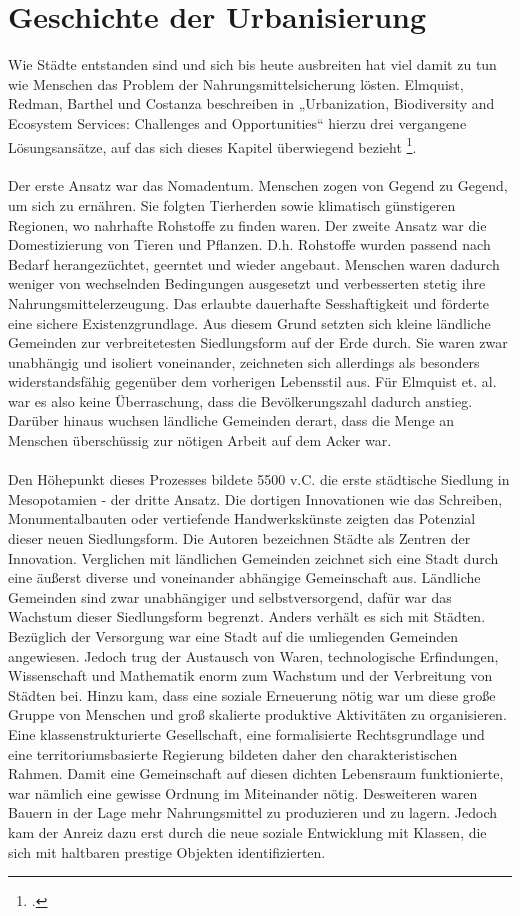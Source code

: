 \documentclass{article}
\begin{document}
\section{Geschichte der Urbanisierung}

Wie Städte entstanden sind und sich bis heute ausbreiten hat viel damit zu tun wie Menschen das Problem der Nahrungsmittelsicherung lösten. Elmquist, Redman, Barthel und Costanza beschreiben in „Urbanization, Biodiversity and Ecosystem Services: Challenges and Opportunities“ hierzu drei vergangene Lösungsansätze, auf das sich dieses Kapitel überwiegend bezieht  \footcite[S.14ff]{Elmqvist2013}. 
\\
\\ 
Der erste Ansatz war das Nomadentum. Menschen zogen von Gegend zu Gegend, um sich zu ernähren. Sie folgten Tierherden sowie klimatisch günstigeren Regionen, wo nahrhafte Rohstoffe zu finden waren. Der zweite Ansatz war die Domestizierung von Tieren und Pflanzen. D.h. Rohstoffe wurden passend nach Bedarf herangezüchtet, geerntet und wieder angebaut. Menschen waren dadurch weniger von wechselnden Bedingungen ausgesetzt und verbesserten stetig ihre Nahrungsmittelerzeugung. Das erlaubte dauerhafte Sesshaftigkeit und förderte eine sichere Existenzgrundlage. Aus diesem Grund setzten sich kleine ländliche Gemeinden zur verbreitetesten Siedlungsform auf der Erde durch. Sie waren zwar unabhängig und isoliert voneinander, zeichneten sich allerdings als besonders widerstandsfähig gegenüber dem vorherigen Lebensstil aus. Für Elmquist et. al. war es also keine Überraschung, dass die Bevölkerungszahl dadurch anstieg. Darüber hinaus wuchsen ländliche Gemeinden derart, dass die Menge an Menschen überschüssig zur nötigen Arbeit auf dem Acker war. \\
\\
Den Höhepunkt dieses Prozesses bildete 5500 v.C. die erste städtische Siedlung in Mesopotamien - der dritte Ansatz. Die dortigen Innovationen wie das Schreiben, Monumentalbauten oder vertiefende Handwerkskünste zeigten das Potenzial dieser neuen Siedlungsform. Die Autoren bezeichnen Städte als Zentren der Innovation. Verglichen mit ländlichen Gemeinden zeichnet sich eine Stadt durch eine äußerst diverse und voneinander abhängige Gemeinschaft aus. Ländliche Gemeinden sind zwar unabhängiger und selbstversorgend, dafür war das Wachstum dieser Siedlungsform begrenzt. Anders verhält es sich mit Städten. Bezüglich der Versorgung war eine Stadt auf die umliegenden Gemeinden angewiesen. Jedoch trug der Austausch von Waren, technologische Erfindungen, Wissenschaft und Mathematik enorm zum Wachstum und der Verbreitung von Städten bei. Hinzu kam, dass eine soziale Erneuerung nötig war um diese große Gruppe von Menschen und groß skalierte produktive Aktivitäten zu organisieren. Eine klassenstrukturierte Gesellschaft, eine formalisierte Rechtsgrundlage und eine territoriumsbasierte Regierung bildeten daher den charakteristischen Rahmen. Damit eine Gemeinschaft auf diesen dichten Lebensraum funktionierte, war nämlich eine gewisse Ordnung im Miteinander nötig. Desweiteren waren Bauern in der Lage mehr Nahrungsmittel zu produzieren und zu lagern. Jedoch kam der Anreiz dazu erst durch die neue soziale Entwicklung mit Klassen, die sich mit haltbaren prestige Objekten identifizierten. 
\end{document}
